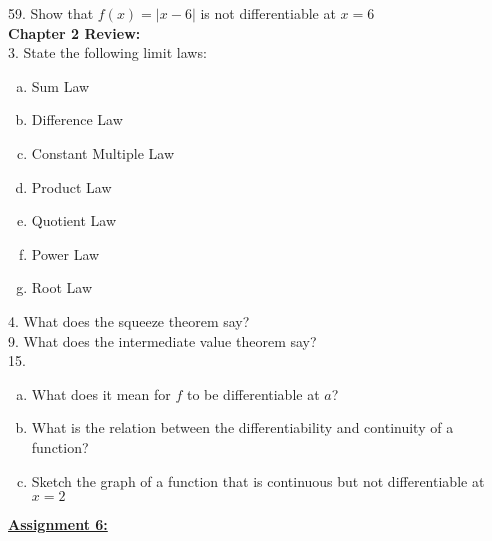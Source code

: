 \documentclass{letter}
\begin{document}
\begin{itemize}
		59. Show that $f(x) = |x-6|$ is not differentiable at $x=6$\\
		
		\textbf{Chapter 2 Review:}\\
		
		3. State the following limit laws:
		\begin{enumerate}[a)]
			\item Sum Law
			\item Difference Law
			\item Constant Multiple Law
			\item Product Law
			\item Quotient Law
			\item Power Law
			\item Root Law\\
		\end{enumerate}
		
		4. What does the squeeze theorem say?\\
		
		9. What does the intermediate value theorem say?\\
		
		15. \begin{enumerate}[a)]
				\item What does it mean for $f$ to be differentiable at $a$?
				\item What is the relation between the differentiability and continuity of a function?
				\item Sketch the graph of a function that is continuous but not differentiable at $x = 2$
			\end{enumerate}
	\end{itemize}
	\clearpage
	\large\underline{\textbf{Assignment 6:}}
\end{document}
